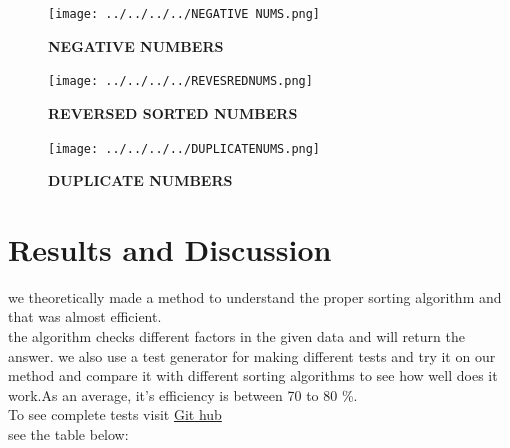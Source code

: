 \documentclass[
10pt, %
a4paper, %
oneside, %
headinclude,footinclude, %
BCOR5mm, %
]{scrartcl}
\begin{document}
 \begin{figure}[htbp]
\centerline{ \texttt{[image: ../../../../NEGATIVE NUMS.png]} }
\caption{\textbf{NEGATIVE NUMBERS}}
\label{fig}
\end{figure}


 \begin{figure}[htbp]
\centerline{\texttt{[image: ../../../../REVESREDNUMS.png]} }
\caption{\textbf{REVERSED SORTED NUMBERS}}
\label{fig}
\end{figure}


 \begin{figure}[htbp]
\centerline{ \texttt{[image: ../../../../DUPLICATENUMS.png]} }
\caption{\textbf{DUPLICATE NUMBERS}}
\label{fig}
\end{figure}

\newpage

\begin{center}

\end{center}




\section{Results and Discussion}


we theoretically made a method to understand the proper sorting  algorithm and that was almost efficient.\\
the algorithm checks different factors in the given data and will return the answer. we also use a test generator for making different tests and try it on our method and compare it with different sorting algorithms to see how well does it work.As an average, it's efficiency is between 70 to 80 \%.
\\
To see complete tests visit \href{https://github.com/prhdm/Best-sorting-algorithm}{Git hub}
\\
see the table below:
\\
\end{document}
